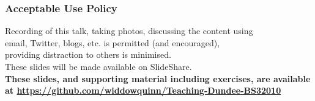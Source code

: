 
%
\begin{frame}
  \frametitle{Acceptable Use Policy}
  Recording of this talk, taking photos, discussing the content using \\
  email, Twitter, blogs, etc. is permitted (and encouraged), \\
  providing distraction to others is minimised. \\[0.5cm]
  These slides will be made available on SlideShare. \\[0.5cm]
  \textbf{These slides, and supporting material including exercises, are available at \href{https://github.com/widdowquinn/Teaching-Dundee-BS32010}{https://github.com/widdowquinn/Teaching-Dundee-BS32010}}
\end{frame}